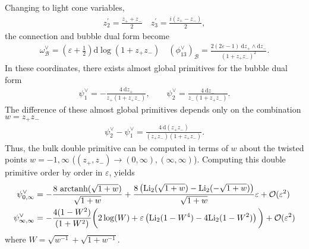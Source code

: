 \documentclass[11pt]{article}
\renewcommand{\d}{\text{d}}
\newcommand{\nn}{\nonumber}
\renewcommand{\O}{\mathcal{O}}
\newcommand{\B}{\mathcal{B}}
\newcommand{\Li}{{\rm Li}}
\newcommand{\vep}{\varepsilon}
\begin{document}
Changing to light cone variables, 
\begin{align}
	z_2^\prime = \frac{z_+ + z_-}{2} 
	\quad 
	z_3^\prime = \frac{i(z_+ - z_-)}{2},
\end{align}
the connection and bubble dual form become
\begin{align}
	\omega^\vee_\B = \left(\vep+\frac12\right) \d\log(1+z_+z_-)
	\quad
	(\phi_{13}^\vee)_\B = \frac{2(2\vep-1)\ \d z_+ \wedge \d z_-}{(1+z_+z_-)^2}.
\end{align}
In these coordinates, there exists almost global primitives for the bubble dual form
\begin{align}
	\psi_1^\vee = -\frac{4\ \d z_+}{z_+(1+z_+z_-)},
	\qquad
	\psi_2^\vee = \frac{4\ \d z_-}{z_-(1+z_+z_-)}.
\end{align}
The difference of these almost global primitives depends only on the combination $w=z_+z_-$
\begin{align}
	\psi_2^\vee -\psi_1^\vee = \frac{4\ \d(z_+z_-)}{(z_+z_-)(1+z_+z_-)}.
\end{align}
Thus, the bulk double primitive can be computed in terms of $w$ about the twisted points $w=-1,\infty$ ($(z_+,z_-)\to(0,\infty),(\infty,\infty)$). Computing this double primitive order by order in $\vep$, yields
\begin{align}
	\psi_{0,\infty}^\vee
	&= -\frac{8\ \text{arctanh}(\sqrt{1+w})}{\sqrt{1+w}}
		+ \frac{
			8\left( \Li_2(\sqrt{1+w}) - \Li_2(-\sqrt{1+w}) \right)
		}{\sqrt{1+w}} \vep
		+ \O(\vep^2)
\\
	\psi_{\infty,\infty}^\vee
	&= -\frac{4(1-W^2)}{(1+W^2)} 
	\bigg(
		2\log(W) 
		+ \vep \left( \Li_2(1-W^4) - 4 \Li_2(1-W^2) \right)
	\bigg)	
	+ \O(\vep^2)
\end{align}
where $W=\sqrt{w^{-1}}+\sqrt{1+w^{-1}}$. 
\end{document}
